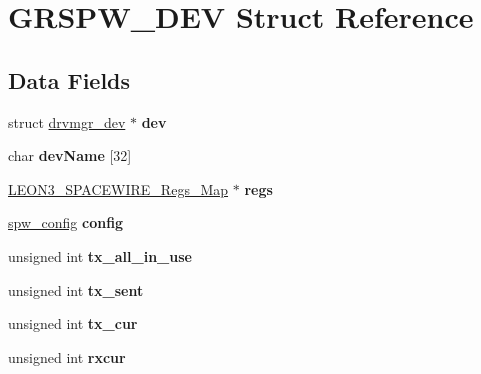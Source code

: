 \hypertarget{structGRSPW__DEV}{}\section{G\+R\+S\+P\+W\+\_\+\+D\+EV Struct Reference}
\label{structGRSPW__DEV}
\subsection*{Data Fields}
\begin{DoxyCompactItemize}
\item 
\mbox{\label{structGRSPW__DEV_a7f442390ceada58636b5cb3ab1437c34}} 
struct \mbox{\hyperlink{structdrvmgr__dev}{drvmgr\+\_\+dev}} $\ast$ {\bfseries dev}
\item 
\mbox{\label{structGRSPW__DEV_a5e0506045c09d250cae2a79962220d46}} 
char {\bfseries dev\+Name} \mbox{[}32\mbox{]}
\item 
\mbox{\label{structGRSPW__DEV_ad6db51aed933bea0a6d5171f5ef865b1}} 
\mbox{\hyperlink{structLEON3__SPACEWIRE__Regs__Map}{L\+E\+O\+N3\+\_\+\+S\+P\+A\+C\+E\+W\+I\+R\+E\+\_\+\+Regs\+\_\+\+Map}} $\ast$ {\bfseries regs}
\item 
\mbox{\label{structGRSPW__DEV_ab8392fac61248a8a67915dc296760645}} 
\mbox{\hyperlink{structspw__config}{spw\+\_\+config}} {\bfseries config}
\item 
\mbox{\label{structGRSPW__DEV_a15e5a71d9386000ea62bfcd8570a59d8}} 
unsigned int {\bfseries tx\+\_\+all\+\_\+in\+\_\+use}
\item 
\mbox{\label{structGRSPW__DEV_a8dc96be6e3d3254863bcd8b0402ef351}} 
unsigned int {\bfseries tx\+\_\+sent}
\item 
\mbox{\label{structGRSPW__DEV_ab38a4973d25412f6c4715d28417c101c}} 
unsigned int {\bfseries tx\+\_\+cur}
\item 
\mbox{\label{structGRSPW__DEV_af33e546c31b8a13db8fbe260cf654de0}} 
unsigned int {\bfseries rxcur}
\item 
\mbox{\label{structGRSPW__DEV_aec815dd62da6640fbc35cacca0a397a3}} 

\end{DoxyCompactItemize}
